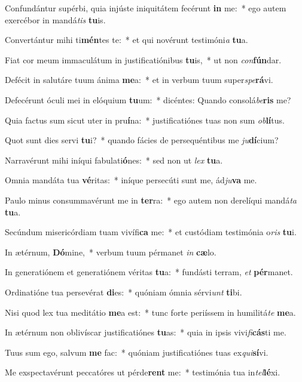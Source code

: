 \item Confundántur supérbi, quia injúste iniquitátem fecérunt \textbf{in} me:~* ego autem exercébor in mandá\textit{tis} \textbf{tu}is.
\item Convertántur mihi ti\textbf{mén}tes te:~* et qui novérunt testimóni\textit{a} \textbf{tu}a.
\item Fiat cor meum immaculátum in justificatiónibus \textbf{tu}is,~* ut non \textit{con}\textbf{fún}dar.
\item Defécit in salutáre tuum ánima \textbf{me}a:~* et in verbum tuum super\textit{spe}\textbf{rá}vi.
\item Defecérunt óculi mei in elóquium \textbf{tu}um:~* dicéntes: Quando consolá\textit{be}\textbf{ris} me?
\item Quia factus sum sicut uter in pru\textbf{í}na:~* justificatiónes tuas non sum \textit{ob}\textbf{lí}tus.
\item Quot sunt dies servi \textbf{tu}i?~* quando fácies de persequéntibus me \textit{ju}\textbf{dí}cium?
\item Narravérunt mihi iníqui fabulati\textbf{ó}nes:~* sed non ut \textit{lex} \textbf{tu}a.
\item Omnia mandáta tua \textbf{vé}ritas:~* iníque persecúti sunt me, ád\textit{ju}\textbf{va} me.
\item Paulo minus consummavérunt me in \textbf{ter}ra:~* ego autem non derelíqui mandá\textit{ta} \textbf{tu}a.
\item Secúndum misericórdiam tuam vivífi\textbf{ca} me:~* et custódiam testimónia o\textit{ris} \textbf{tu}i.
\item In ætérnum, \textbf{Dó}mine,~* verbum tuum pérmanet \textit{in} \textbf{cæ}lo.
\item In generatiónem et generatiónem véritas \textbf{tu}a:~* fundásti terram, \textit{et} \textbf{pér}manet.
\item Ordinatióne tua persevérat \textbf{di}es:~* quóniam ómnia sérvi\textit{unt} \textbf{ti}bi.
\item Nisi quod lex tua meditátio \textbf{me}a est:~* tunc forte periíssem in humilitá\textit{te} \textbf{me}a.
\item In ætérnum non oblivíscar justificatiónes \textbf{tu}as:~* quia in ipsis vivi\textit{fi}\textbf{cás}ti me.
\item Tuus sum ego, salvum \textbf{me} fac:~* quóniam justificatiónes tuas ex\textit{qui}\textbf{sí}vi.
\item Me exspectavérunt peccatóres ut pérde\textbf{rent} me:~* testimónia tua in\textit{tel}\textbf{lé}xi.
